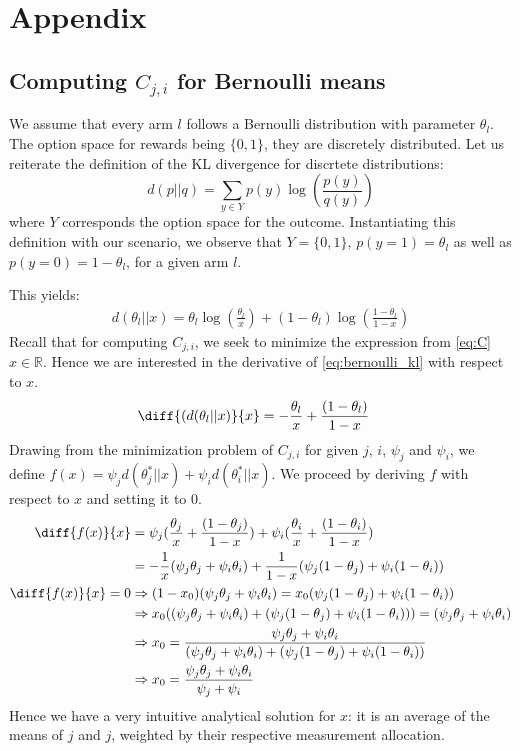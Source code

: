 \chapter{Appendix}

\section{Computing $C_{j, i}$ for Bernoulli means}\label{section:bernoulli_c}

We assume that every arm $l$ follows a Bernoulli distribution with parameter $\theta_l$. The option space for rewards being $\{0, 1\}$, they are discretely distributed. Let us reiterate the definition of the KL divergence for discrtete distributions:
\[d(p || q) = \sum_{y \in Y}p(y) \log(\frac{p(y)}{q(y)})\]
where $Y$ corresponds the option space for the outcome.
Instantiating this definition with our scenario, we observe that $Y=\{0, 1\}$, $p(y=1)=\theta_l$  as well as $p(y=0)=1-\theta_l$, for a given arm $l$.

This yields:
\begin{align}
  d(\theta_l||x) = \theta_l \log(\frac{\theta_l}{x}) + (1-\theta_l) \log(\frac{1-\theta_l}{1-x}) \label{eq:bernoulli_kl}
\end{align}
Recall that for computing $C_{j, i}$, we seek to minimize the expression from \eqref{eq:C} $x \in \mathbb{R}$. Hence we are interested in the derivative of \eqref{eq:bernoulli_kl} with respect to $x$.
\begin{align}
  \diff{(d(\theta_l||x)}{x} &= - \frac{\theta_l}{x} + \frac{(1-\theta_l)}{1-x}
\end{align}
Drawing from the minimization problem of $C_{j,i}$ for given $j$, $i$, $\psi_j$ and $\psi_i$, we define $f(x) = \psi_j d(\theta^*_{j} || x) + \psi_i d(\theta_{i}^* ||x)$. We proceed by deriving $f$ with respect to $x$ and setting it to 0.
\begin{align}
  \diff{f(x)}{x} &= \psi_j(\frac{\theta_j}{x} + \frac{(1-\theta_j)}{1-x}) + \psi_i( \frac{\theta_i}{x} + \frac{(1-\theta_i)}{1-x}) \\
  &= -\frac{1}{x}(\psi_j\theta_j + \psi_i\theta_i) + \frac{1}{1-x}(\psi_j(1 - \theta_j) + \psi_i(1 - \theta_i)) \\
  \diff{f(x)}{x} = 0 &\Rightarrow (1-x_0)(\psi_j\theta_j + \psi_i\theta_i) = x_0(\psi_j(1 - \theta_j) + \psi_i(1 - \theta_i))\\
  &\Rightarrow x_0((\psi_j\theta_j + \psi_i\theta_i) + (\psi_j(1 - \theta_j) + \psi_i(1 - \theta_i))) = (\psi_j\theta_j + \psi_i\theta_i)\\
  &\Rightarrow x_0 = \frac{\psi_j\theta_j + \psi_i\theta_i}{(\psi_j\theta_j + \psi_i\theta_i) + (\psi_j(1 - \theta_j) + \psi_i(1 - \theta_i))} \\
  &\Rightarrow x_0 = \frac{\psi_j\theta_j + \psi_i\theta_i}{\psi_j + \psi_i}
\end{align}
Hence we have a very intuitive analytical solution for $x$: it is an average of the means of $j$ and $j$, weighted by their respective measurement allocation.

